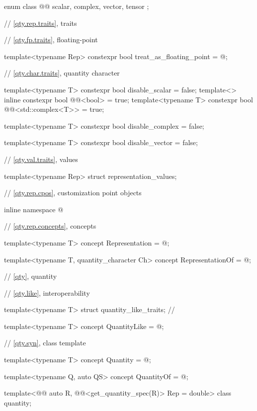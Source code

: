 \begin{codeblock}
{enum class @@ { scalar, complex, vector, tensor };

// \ref{qty.rep.traits}, traits

// \ref{qty.fp.traits}, floating-point

template<typename Rep>
constexpr bool treat_as_floating_point = @\seebelownc@;

// \ref{qty.char.traits}, quantity character

template<typename T>
constexpr bool disable_scalar = false;
template<>
inline constexpr bool @@<bool> = true;
template<typename T>
constexpr bool @@<std::complex<T>> = true;

template<typename T>
constexpr bool disable_complex = false;

template<typename T>
constexpr bool disable_vector = false;

// \ref{qty.val.traits}, values

template<typename Rep>
struct representation_values;

// \ref{qty.rep.cpos}, customization point objects

inline namespace @

// \ref{qty.rep.concepts}, concepts

template<typename T>
concept Representation = @\seebelownc@;

template<typename T, quantity_character Ch>
concept RepresentationOf = @\seebelownc@;

// \ref{qty}, quantity

// \ref{qty.like}, interoperability

template<typename T>
struct quantity_like_traits;  // \notdef

template<typename T>
concept QuantityLike = @\seebelownc@;

// \ref{qty.syn}, class template 

template<typename T>
concept Quantity = @\seebelownc@;

template<typename Q, auto QS>
concept QuantityOf = @\seebelownc@;

template<@@ auto R, @@<get_quantity_spec(R)> Rep = double>
class quantity;

}
\end{codeblock}
